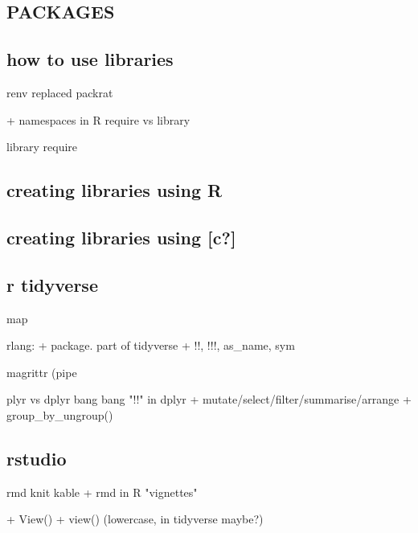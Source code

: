 \subsection{PACKAGES}
\subsection{how to use libraries}
renv replaced packrat

+ namespaces in R
require vs library

library
require
\subsection{creating libraries using R}
\subsection{creating libraries using [c?]}
\subsection{r tidyverse}
map

rlang:
+ package. part of tidyverse
+ !!, !!!, as\_name, sym

magrittr (pipe %

plyr vs dplyr
bang bang "!!" in dplyr
+ mutate/select/filter/summarise/arrange
+ group\_by\_ungroup()
\subsection{rstudio}

rmd
knit
kable
+ rmd in R
"vignettes"

+ View()
+ view() (lowercase, in tidyverse maybe?)


